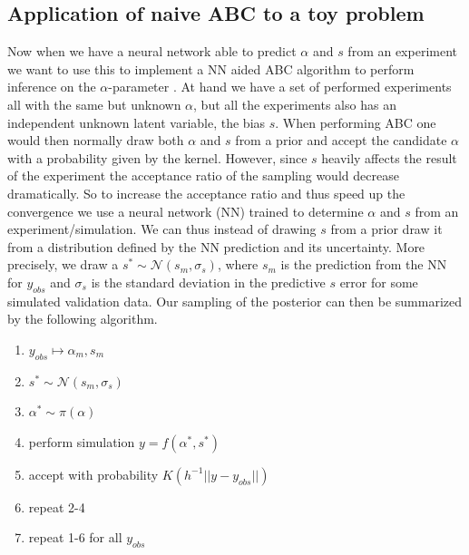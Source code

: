 \documentclass[11pt,a4paper]{article}
\begin{document}


\subsection{Application of naive ABC to a toy problem}
Now when we have a neural network able to predict $\alpha$ and $s$ from an experiment we want to use this to implement a NN aided ABC algorithm to perform inference on the $\alpha$-parameter \cite{lec3}. At hand we have a set of performed experiments all with the same but unknown $\alpha$, but all the experiments also has an independent unknown latent variable, the bias $s$. When performing ABC one would then normally draw both $\alpha$ and $s$ from a prior and accept the candidate $\alpha$ with a probability given by the kernel. However, since $s$ heavily affects the result of the experiment the acceptance ratio of the sampling would decrease dramatically. So to increase the acceptance ratio and thus speed up the convergence we use a neural network (NN) trained to determine $\alpha$ and $s$ from an experiment/simulation. We can thus instead of drawing $s$ from a prior draw it from a distribution defined by the NN prediction and its uncertainty. More precisely, we draw a $s^* \sim \mathcal{N}(s_m, \sigma_s)$, where $s_m$ is the prediction from the NN for $y_{obs}$ and $\sigma_s$ is the standard deviation in the predictive $s$ error for some simulated validation data. Our sampling of the posterior can then be summarized by the following algorithm. 
\begin{enumerate}
    \item $y_{obs} \mapsto \alpha_m, s_m$
    \item $s^* \sim \mathcal{N}(s_m, \sigma_s)$
    \item $\alpha^* \sim \pi(\alpha)$
    \item perform simulation $y = f(\alpha^*, s^*)$
    \item accept with probability $K(h^{-1}||y - y_{obs}||)$
    \item repeat 2-4
    \item repeat 1-6 for all $y_{obs}$
\end{enumerate}
\end{document}
